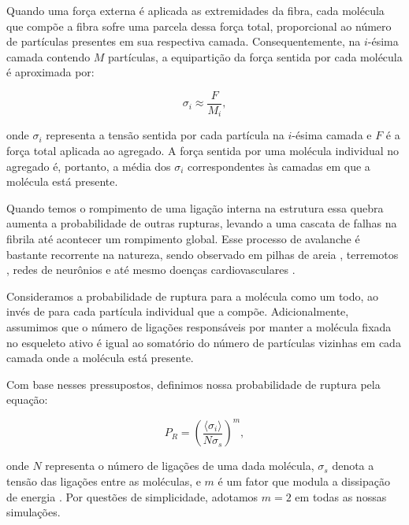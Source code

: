 \documentclass[11pt,a4paper]{article} %
\begin{document}
    Quando uma força externa é aplicada as extremidades da fibra, cada molécula que compõe a fibra sofre uma parcela  
    dessa força total, proporcional ao número de partículas presentes em sua respectiva camada. Consequentemente, na  
    \(i\)-ésima camada contendo \(M\) partículas, a equipartição da força sentida por cada molécula é aproximada 
    por:   

    \begin{equation} 
        \sigma_{i} \approx \frac{F}{M_{i}}, 
    \end{equation} 


    \noindent onde \(\sigma_{i}\) representa a tensão sentida por cada partícula na \(i\)-ésima camada e \(F\) é a força  
    total aplicada ao agregado. A força sentida por uma molécula individual no agregado é, portanto, a média dos \(\sigma_{i}\)  
    correspondentes às camadas em que a molécula está presente.  

    Quando temos o rompimento de uma ligação interna na estrutura essa quebra aumenta a probabilidade de outras rupturas, levando a  
    uma cascata de falhas na fibrila até acontecer um rompimento global. Esse processo de avalanche é bastante recorrente na natureza, 
    sendo observado em pilhas de areia \cite{Jaeger1992PhysicsOT}, terremotos \cite{GODANO1993117}, redes de neurônios \cite{Beggs2003-et} 
    e até mesmo doenças cardiovasculares \cite{Yu2020AvalanchesAP}.  

    Consideramos a probabilidade de ruptura para a molécula como um todo, ao invés de para cada partícula individual que a compõe.  
    Adicionalmente, assumimos que o número de ligações responsáveis por manter a molécula fixada no esqueleto ativo é igual ao somatório  
    do número de partículas vizinhas em cada camada onde a molécula está presente.  

    Com base nesses pressupostos, definimos nossa probabilidade de ruptura pela equação:  

    \begin{equation} 
        P_{R} = \left(\frac{\langle \sigma_{i} \rangle}{N \sigma_{s}}\right)^{m}, 
    \end{equation} 

    \noindent onde \(N\) representa o número de ligações de uma dada molécula, \(\sigma_{s}\) denota a tensão das ligações entre as  
    moléculas, e \(m\) é um fator que modula a dissipação de energia \cite{Parkinson1997,2013}. Por questões de simplicidade, adotamos  
    \(m = 2\) em todas as nossas simulações. 
\end{document}
